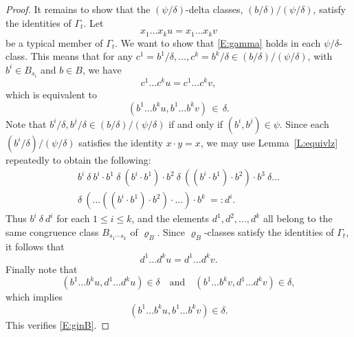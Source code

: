 \documentclass[10pt,a4paper]{amsart}
\begin{document}
\begin{proof}
It remains to show that the $(\psi/\delta)$-delta classes, $(b/\delta)/(\psi/\delta)$,
satisfy the identities of $\Gamma_t$.  Let
\begin{equation}\label{E:gamma}
x_1 \ldots x_k u = x_1 \ldots x_k v
\end{equation}
be a typical member of $\Gamma_t$.
We want to show that \eqref{E:gamma} holds in each $\psi/\delta$-class. This means that
for any $c^1 = b^1/\delta, \ldots, c^k = b^k/\delta \in (b/\delta)/(\psi/\delta)$, with
$b^i \in B_{s_i}$ and $b \in B$, we have
\begin{equation}\label{E:ginC}
c^1 \ldots c^k u = c^1 \ldots c^k v,
\end{equation}
which is equivalent to
\begin{equation}\label{E:ginB}
(b^1 \ldots b^k u, b^1 \ldots b^k v) \, \in \, \delta.
\end{equation}
Note that $b^i/\delta, b^j/\delta \in (b/\delta)/(\psi/\delta)$ if and only if
$(b^i, b^j) \in \psi$. Since each $(b^i /\delta)/(\psi/\delta)$ satisfies the identity
$x \cdot y = x$, we may use Lemma~\ref{L:equivlz} repeatedly to obtain the following:
\begin{multline*}
b^{i}\ \delta\ b^{i}\cdot b^{1}\ \delta \ (b^{i}\cdot b^{1})\cdot b^{2}\ \delta\ ((b^{i}\cdot b^{1})\cdot b^{2})\cdot b^{3}\ \delta\dots\\
\delta\ (\ldots((b^{i}\cdot b^{1})\cdot b^{2})\cdot \ldots)\cdot b^{k}\ =: d^i.
\end{multline*}
Thus $b^{i}\ \delta\ d^i$ for each $1 \leq i \leq k$, and the elements
$d^1, d^2, \ldots, d^k$ all belong to the same congruence class $B_{s_{1}\cdots s_k}$ of
$\varrho_B$.  Since $\varrho_B$-classes satisfy the identities of $\Gamma_t$, it follows
that
\begin{equation*}
d^1 \ldots d^k u = d^1 \ldots d^k v.
\end{equation*}
Finally note that
\begin{equation*}
(b^1 \ldots b^k u, d^1 \ldots d^k u) \in \delta \quad \mbox{and} \quad (b^1 \ldots b^k v,
d^1 \ldots d^k v) \in \delta,
\end{equation*}
which implies
\begin{equation*}
(b^1 \ldots b^k u, b^1 \ldots b^k v) \in \delta.
\end{equation*}
This verifies \eqref{E:ginB}.
\end{proof}
\end{document}
